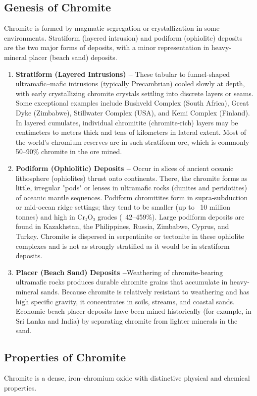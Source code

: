 \documentclass[12pt,a4paper, top=1.9cm, bottom=2.03cm, left=3.81cm, right=1.9cm]{article}
\begin{document}
\subsection{Genesis of Chromite}
\noindent\fontsize{12}{14}\selectfont Chromite is formed by magmatic segregation or crystallization in some environments. Stratiform (layered intrusion) and podiform (ophiolite) deposits are the two major forms of deposits, with a minor representation in heavy-mineral placer (beach sand) deposits.
\begin{enumerate}[label=\arabic*.]  %
    \item \textbf{Stratiform (Layered Intrusions) –} These tabular to funnel-shaped ultramafic–mafic intrusions (typically Precambrian) cooled slowly at depth, with early crystallizing chromite crystals settling into discrete layers or seams. Some exceptional examples include Bushveld Complex (South Africa), Great Dyke (Zimbabwe), Stillwater Complex (USA), and Kemi Complex (Finland). In layered cumulates, individual chromitite (chromite-rich) layers may be centimeters to meters thick and tens of kilometers in lateral extent. Most of the world's chromium reserves are in such stratiform ore, which is commonly 50–90\% chromite in the ore mined.
    \item \textbf{Podiform (Ophiolitic) Deposits –} Occur in slices of ancient oceanic lithosphere (ophiolites) thrust onto continents. There, the chromite forms as little, irregular "pods" or lenses in ultramafic rocks (dunites and peridotites) of oceanic mantle sequences. Podiform chromitites form in supra-subduction or mid-ocean ridge settings; they tend to be smaller (up to ~10 million tonnes) and high in Cr₂O₃ grades (~42–459\%). Large podiform deposits are found in Kazakhstan, the Philippines, Russia, Zimbabwe, Cyprus, and Turkey. Chromite is dispersed in serpentinite or tectonite in these ophiolite complexes and is not as strongly stratified as it would be in stratiform deposits.
    \item \textbf{Placer (Beach Sand) Deposits –}Weathering of chromite-bearing ultramafic rocks produces durable chromite grains that accumulate in heavy-mineral sands. Because chromite is relatively resistant to weathering and has high specific gravity, it concentrates in soils, streams, and coastal sands. Economic beach placer deposits have been mined historically (for example, in Sri Lanka and India) by separating chromite from lighter minerals in the sand.
\end{enumerate}
\subsection{Properties of Chromite}
\noindent\fontsize{12}{14}\selectfont Chromite is a dense, iron–chromium oxide with distinctive physical and chemical properties.
\end{document}
